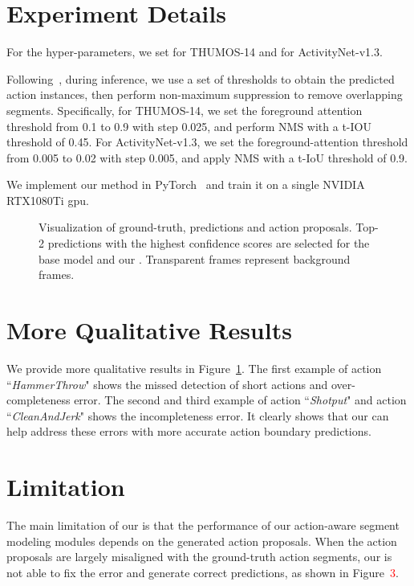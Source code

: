 \section{Experiment Details}
\label{sec:experiment_details}
For the hyper-parameters, we set  for THUMOS-14 and  for ActivityNet-v1.3.

Following~\cite{zhang2021cola,qu2021acm}, during inference, we use a set of thresholds to obtain the predicted action instances, then perform non-maximum suppression to remove overlapping segments. Specifically, for THUMOS-14, we set the foreground attention threshold from 0.1 to 0.9 with step 0.025, and perform NMS with a t-IOU threshold of 0.45. For ActivityNet-v1.3, we set the foreground-attention threshold from 0.005 to 0.02 with step 0.005, and apply NMS with a t-IoU threshold of 0.9.

We implement our method in PyTorch~\cite{paszke2019pytorch} and train it on a single NVIDIA RTX1080Ti gpu.


\begin{figure}[t]
    \centering
    \vspace{-0.2in}
    \vspace{-0.2in}
    \caption{Visualization of ground-truth, predictions and action proposals. Top-2 predictions with the highest confidence scores are selected for the base model and our \system. Transparent frames represent background frames.}
    \label{fig:qualitative_more}
    \vspace{-0.1in}
\end{figure}

\section{More Qualitative Results}
\label{sec:qualitative_more}
We provide more qualitative results in Figure~\ref{fig:qualitative_more}. 
The first example of action ``\textit{HammerThrow}" shows the missed detection of short actions and over-completeness error.
The second and third example of action ``\textit{Shotput}" and action ``\textit{CleanAndJerk}" shows the incompleteness error.
It clearly shows that our \system can help address these errors with more accurate action boundary predictions.


\section{Limitation}
\label{sec:limitation}
The main limitation of our \system is that the performance of our action-aware segment modeling modules depends on the generated action proposals. When the action proposals are largely misaligned with the ground-truth action segments, our \system is not able to fix the error and generate correct predictions, as shown in Figure~\textcolor{red}{3}.


